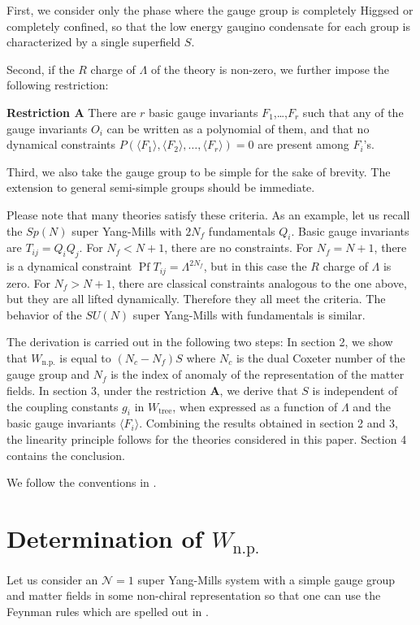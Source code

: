\documentclass[a4paper,12pt]{article}
\def\ex#1{\langle#1\rangle}
\def\W#1{W_{\text{#1}}}
\def\Nis{\mathcal{N}=}
\def\Pf{\mathop{\text{Pf}}}
\begin{document}
First, we consider only the phase where the gauge group is completely Higgsed
or completely confined, so that the low energy gaugino condensate
for each group is characterized by a single superfield $S$.

Second, if the $R$ charge of $\Lambda$
of the theory is non-zero, 
we further impose the following restriction: %

\noindent\textbf{Restriction A}\quad
There are $r$ basic gauge invariants $F_1$,\ldots,$F_r$
such that any of the gauge invariants $O_i$ can be
written as a polynomial of them,
and that no dynamical constraints $P(\ex{F_1},\ex{F_2},\ldots,\ex{F_r})=0$
are present among $F_i$'s.

Third, we also take the gauge group to be simple
for the sake of brevity. The extension to general semi-simple groups
should be immediate. 

Please note that many theories satisfy these criteria.
As an example, let us recall the $Sp(N)$ super Yang-Mills
 with $2N_f$ fundamentals $Q_i$.
Basic gauge invariants are $T_{ij}=Q_iQ_j$.
For $N_f<N+1$, there are no constraints.
For $N_f=N+1$, there is a dynamical constraint $\Pf T_{ij}=\Lambda^{2N_f}$,
but in this case the $R$ charge of $\Lambda$ is zero.
For $N_f>N+1$, there are classical constraints analogous to the one above,
but they are all lifted dynamically.
Therefore they all meet the criteria.
The behavior of the $SU(N)$ super Yang-Mills 
with fundamentals is similar.



The derivation  is carried out in the following two steps:
In section 2, we show that %
$\W{n.p.}$ is equal to $(N_c-N_f)S$ where $N_c$ is the dual Coxeter number
of the gauge group and $N_f$ is the index of anomaly of
the representation of the matter fields. 
In section 3, under the restriction \textbf{A},
we derive that $S$ is
independent of the coupling constants $g_i$ in $\W{tree}$,
 when expressed as a function of 
$\Lambda$ and the basic gauge invariants $\ex{F_i}$.
Combining the results obtained in section 2 and 3,
the linearity principle follows for the theories considered in this paper.
Section 4 contains the conclusion.

We follow the conventions in \cite{Dijkgraaf:2002xd}.

\section{Determination of $\W{n.p.}$}
Let us consider an $\Nis1$ super Yang-Mills system with
a simple gauge group and 
matter fields in some non-chiral representation so that
one can use the Feynman rules which are spelled out in \cite{Dijkgraaf:2002xd}.
\end{document}
